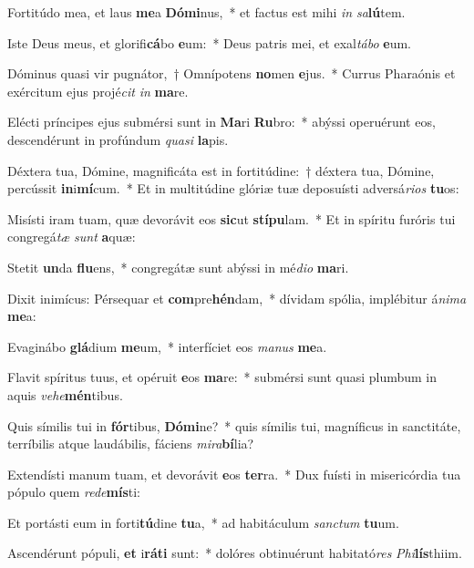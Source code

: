 \item Fortitúdo mea, et laus \textbf{me}a \textbf{Dó}\textbf{mi}nus,~* et factus est mihi \textit{in} \textit{sa}\textbf{lú}tem.
\item Iste Deus meus, et glorifi\textbf{cá}bo \textbf{e}um:~* Deus patris mei, et exal\textit{tá}\textit{bo} \textbf{e}um.
\item Dóminus quasi vir pugnátor,~† Omnípotens \textbf{no}men \textbf{e}jus.~* Currus Pharaónis et exércitum ejus projé\textit{cit} \textit{in} \textbf{ma}re.
\item Elécti príncipes ejus submérsi sunt in \textbf{Ma}ri \textbf{Ru}bro:~* abýssi operuérunt eos, descendérunt in profúndum \textit{qua}\textit{si} \textbf{la}pis.
\item Déxtera tua, Dómine, magnificáta est in fortitúdine:~† déxtera tua, Dómine, percússit \textbf{in}i\textbf{mí}cum.~* Et in multitúdine glóriæ tuæ deposuísti adversá\textit{ri}\textit{os} \textbf{tu}os:
\item Misísti iram tuam, quæ devorávit eos \textbf{sic}ut \textbf{stí}\textbf{pu}lam.~* Et in spíritu furóris tui congregá\textit{tæ} \textit{sunt} \textbf{a}quæ:
\item Stetit \textbf{un}da \textbf{flu}ens,~* congregátæ sunt abýssi in mé\textit{di}\textit{o} \textbf{ma}ri.
\item Dixit inimícus: Pérsequar et \textbf{com}pre\textbf{hén}dam,~* dívidam spólia, implébitur á\textit{ni}\textit{ma} \textbf{me}a:
\item Evaginábo \textbf{glá}dium \textbf{me}um,~* interfíciet eos \textit{ma}\textit{nus} \textbf{me}a.
\item Flavit spíritus tuus, et opéruit \textbf{e}os \textbf{ma}re:~* submérsi sunt quasi plumbum in aquis \textit{ve}\textit{he}\textbf{mén}tibus.
\item Quis símilis tui in \textbf{fór}tibus, \textbf{Dó}\textbf{mi}ne?~* quis símilis tui, magníficus in sanctitáte, terríbilis atque laudábilis, fáciens \textit{mi}\textit{ra}\textbf{bí}lia?
\item Extendísti manum tuam, et devorávit \textbf{e}os \textbf{ter}ra.~* Dux fuísti in misericórdia tua pópulo quem \textit{red}\textit{e}\textbf{mís}ti:
\item Et portásti eum in forti\textbf{tú}dine \textbf{tu}a,~* ad habitáculum \textit{sanc}\textit{tum} \textbf{tu}um.
\item Ascendérunt pópuli, \textbf{et} i\textbf{rá}\textbf{ti} sunt:~* dolóres obtinuérunt habitató\textit{res} \textit{Phi}\textbf{lís}thiim.
